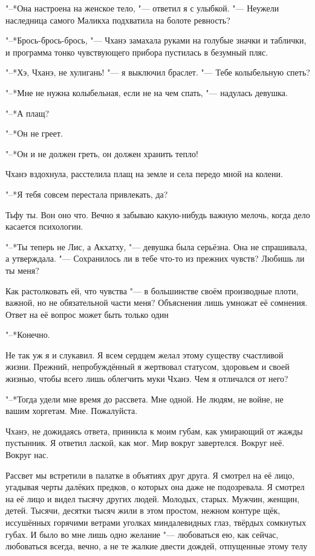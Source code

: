 \documentclass[a4paper,10pt,fleqn]{book}
\newcommand{\ldotst}{\so{...}\xspace}
\begin{document}
"--*Она настроена на женское тело, "--- ответил я с улыбкой.
"--- Неужели наследница самого Маликха подхватила на болоте ревность?

"--*Брось-брось-брось, "--- Чханэ замахала руками на голубые значки и таблички, и программа тонко чувствующего прибора пустилась в безумный пляс.

"--*Хэ, Чханэ, не хулигань! "--- я выключил браслет.
"--- Тебе колыбельную спеть?

"--*Мне не нужна колыбельная, если не на чем спать, "--- надулась девушка.

"--*А плащ?

"--*Он не греет.

"--*Он и не должен греть, он должен хранить тепло!

Чханэ вздохнула, расстелила плащ на земле и села передо мной на колени.

"--*Я тебя совсем перестала привлекать, да?

Тьфу ты.
Вон оно что.
Вечно я забываю какую-нибудь важную мелочь, когда дело касается психологии.

"--*Ты теперь не Лис, а Акхатху, "--- девушка была серьёзна.
Она не спрашивала, а утверждала.
"--- Сохранилось ли в тебе что-то из прежних чувств?
Любишь ли ты меня?

Как растолковать ей, что чувства "--- в большинстве своём производные плоти, важной, но не обязательной части меня?
Объяснения лишь умножат её сомнения.
Ответ на её вопрос может быть только один\ldotst

"--*Конечно.

Не так уж я и слукавил.
Я всем сердцем желал этому существу счастливой жизни.
Прежний, непробуждённый я жертвовал статусом, здоровьем и своей жизнью, чтобы всего лишь облегчить муки Чханэ.
Чем я отличался от него?

"--*Тогда удели мне время до рассвета.
Мне одной.
Не людям, не войне, не вашим хоргетам.
Мне.
Пожалуйста.

Чханэ, не дожидаясь ответа, приникла к моим губам, как умирающий от жажды пустынник.
Я ответил лаской, как мог.
Мир вокруг завертелся.
Вокруг неё.
Вокруг нас.

Рассвет мы встретили в палатке в объятиях друг друга.
Я смотрел на её лицо, угадывая черты далёких предков, о которых она даже не подозревала.
Я смотрел на её лицо и видел тысячу других людей.
Молодых, старых.
Мужчин, женщин, детей.
Тысячи, десятки тысяч жили в этом простом, нежном контуре щёк, иссушённых горячими ветрами уголках миндалевидных глаз, твёрдых сомкнутых губах.
И было во мне лишь одно желание "--- любоваться ею, как сейчас, любоваться всегда, вечно, а не те жалкие двести дождей, отпущенные этому телу\ldotst
\end{document}
